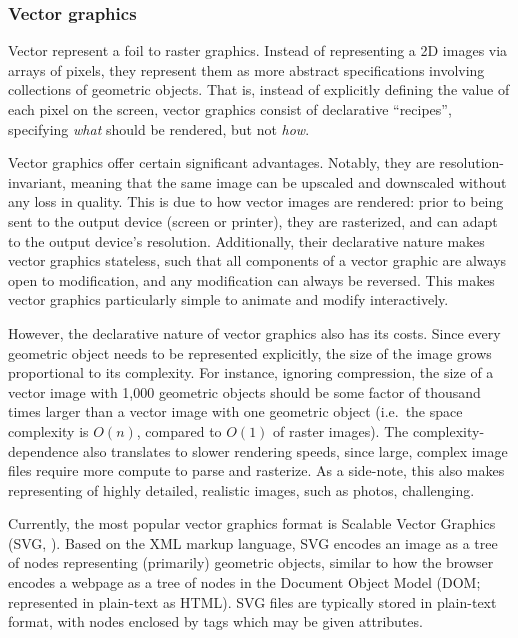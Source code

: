 \documentclass[
  openany]{book}
\theoremstyle{definition}
\theoremstyle{definition}
\theoremstyle{definition}
\theoremstyle{definition}
\theoremstyle{remark}
\begin{document}
\subsubsection{Vector graphics}\label{vector-graphics}

Vector represent a foil to raster graphics. Instead of representing a 2D images via arrays of pixels, they represent them as more abstract specifications involving collections of geometric objects. That is, instead of explicitly defining the value of each pixel on the screen, vector graphics consist of declarative ``recipes'', specifying \emph{what} should be rendered, but not \emph{how}.

Vector graphics offer certain significant advantages. Notably, they are resolution-invariant, meaning that the same image can be upscaled and downscaled without any loss in quality. This is due to how vector images are rendered: prior to being sent to the output device (screen or printer), they are rasterized, and can adapt to the output device's resolution. Additionally, their declarative nature makes vector graphics stateless, such that all components of a vector graphic are always open to modification, and any modification can always be reversed. This makes vector graphics particularly simple to animate and modify interactively.

However, the declarative nature of vector graphics also has its costs. Since every geometric object needs to be represented explicitly, the size of the image grows proportional to its complexity. For instance, ignoring compression, the size of a vector image with 1,000 geometric objects should be some factor of thousand times larger than a vector image with one geometric object (i.e.~the space complexity is \(O(n)\), compared to \(O(1)\) of raster images). The complexity-dependence also translates to slower rendering speeds, since large, complex image files require more compute to parse and rasterize. As a side-note, this also makes representing of highly detailed, realistic images, such as photos, challenging.

Currently, the most popular vector graphics format is Scalable Vector Graphics (SVG, ). Based on the XML markup language, SVG encodes an image as a tree of nodes representing (primarily) geometric objects, similar to how the browser encodes a webpage as a tree of nodes in the Document Object Model (DOM; represented in plain-text as HTML). SVG files are typically stored in plain-text format, with nodes enclosed by tags which may be given attributes.
\end{document}
